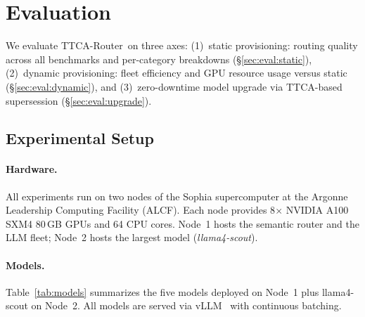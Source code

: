 \documentclass[11pt]{article}
\newcommand{\sysname}{TTCA-Router\xspace}
\newcommand{\ttca}{\textsc{TTCA}\xspace}
\begin{document}
\section{Evaluation}
\label{sec:eval}

We evaluate \sysname\ on three axes:
(1)~static provisioning: routing quality across all benchmarks and per-category breakdowns (\S\ref{sec:eval:static}),
(2)~dynamic provisioning: fleet efficiency and GPU resource usage versus static (\S\ref{sec:eval:dynamic}),
and (3)~zero-downtime model upgrade via \ttca-based supersession (\S\ref{sec:eval:upgrade}).

\subsection{Experimental Setup}
\label{sec:eval:setup}

\paragraph{Hardware.}
All experiments run on two nodes of the Sophia supercomputer at the
Argonne Leadership Computing Facility (ALCF).  Each node provides
8$\times$ NVIDIA A100 SXM4 80\,GB GPUs and 64 CPU cores.
Node~1 hosts the semantic router and the LLM fleet; Node~2 hosts the
largest model (\textit{llama4-scout}).

\paragraph{Models.}
Table~\ref{tab:models} summarizes the five models deployed on Node~1
plus llama4-scout on Node~2.
All models are served via vLLM~\cite{kwon2023vllm} with continuous batching.
\end{document}
